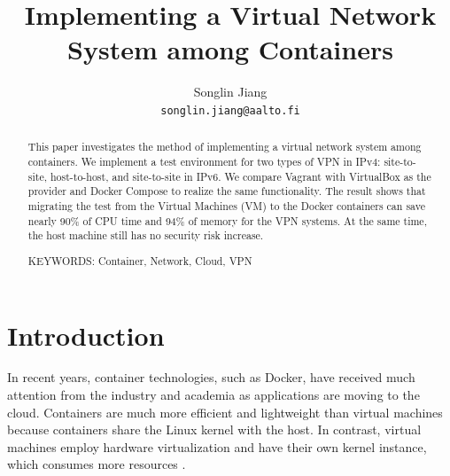 \documentclass[article]{aaltoseries}
\begin{document}
 

\title{Implementing a Virtual Network System among Containers}

\author{Songlin Jiang%
\\\textnormal{\texttt{songlin.jiang@aalto.fi}}} %


\maketitle


\begin{abstract}
This paper investigates the method of implementing a virtual network system among containers. We implement a test environment for two types of VPN in IPv4: site-to-site, host-to-host, and site-to-site in IPv6. We compare Vagrant with VirtualBox as the provider and Docker Compose to realize the same functionality. The result shows that migrating the test from the Virtual Machines (VM) to the Docker containers can save nearly 90\% of CPU time and 94\% of memory for the VPN systems. At the same time, the host machine still has no security risk increase.

\vspace{3mm}
\noindent KEYWORDS: Container, Network, Cloud, VPN

\end{abstract}




\section{Introduction}

In recent years, container technologies, such as Docker, have received much attention from the industry and academia as applications are moving to the cloud. Containers are much more efficient and lightweight than virtual machines because containers share the Linux kernel with the host. In contrast, virtual machines employ hardware virtualization and have their own kernel instance, which consumes more resources \cite{10.1145/2988336.2988337}.
\end{document}
